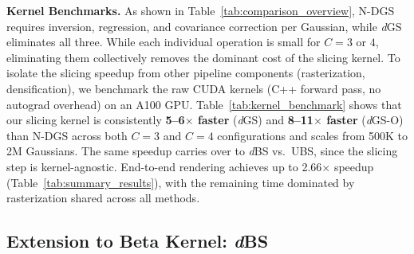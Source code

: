 \documentclass{article}
\newcommand{\dgs}{\textit{d}GS\xspace}
\newcommand{\dbs}{\textit{d}BS\xspace}
\newcommand{\dgso}{\textit{d}GS-O\xspace}
\theoremstyle{plain}
\theoremstyle{definition}
\theoremstyle{remark}
\begin{document}
\textbf{Kernel Benchmarks.} As shown in Table~\ref{tab:comparison_overview}, N-DGS requires inversion, regression, and covariance correction per Gaussian, while \dgs{} eliminates all three. While each individual operation is small for $C{=}3$ or $4$, eliminating them collectively removes the dominant cost of the slicing kernel. To isolate the slicing speedup from other pipeline components (rasterization, densification), we benchmark the raw CUDA kernels (C++ forward pass, no autograd overhead) on an A100 GPU. Table~\ref{tab:kernel_benchmark} shows that our slicing kernel is consistently \textbf{5--6$\times$ faster} (\dgs{}) and \textbf{8--11$\times$ faster} (\dgso{}) than N-DGS across both $C{=}3$ and $C{=}4$ configurations and scales from 500K to 2M Gaussians. The same speedup carries over to \dbs{} vs.\ UBS, since the slicing step is kernel-agnostic. End-to-end rendering achieves up to 2.66$\times$ speedup (Table~\ref{tab:summary_results}), with the remaining time dominated by rasterization shared across all methods.

\begin{table}[t]
\centering
\caption{CUDA kernel benchmark: slicing-only forward pass time (ms) on A100. N-DGS and \dgs{} share the same C++ entry point with identical inputs, isolating the slicing computation. The same speedup pattern holds for \dbs{} vs.\ UBS, since the slicing step is kernel-agnostic.}
\label{tab:kernel_benchmark}
\setlength{\tabcolsep}{4pt}
\vspace{-1em}
\end{table}

\subsection{Extension to Beta Kernel: \dbs{}}
\label{subsec:dbs}
\end{document}
